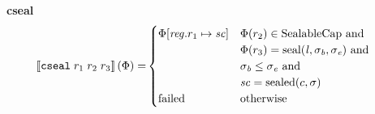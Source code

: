 \documentclass[a4paper]{article}
\newcommand{\sem}[1]{\left\llbracket #1 \right\rrbracket}
\newcommand{\tand}{\text{ and }}
\newcommand{\totherwise}{\text{otherwise }}
\newcommand{\targetcolor}[1]{\color{black}}
\newcommand{\trg}[1]{{\targetcolor{} #1}}
\newcommand{\zinstr}[1]{\texttt{#1}}
\newcommand{\threeinstr}[4]{
  \ifthenelse{\equal{#2#3#4}{}}
  {\zinstr{#1}}
  {\zinstr{#1} \; #2 \; #3 \; #4}
}
\newcommand{\tcseal}[3]{\threeinstr{\trg{cseal}}{#1}{#2}{#3}}
\newcommand{\update}[2]{[#1 \mapsto #2]}
\newcommand{\updReg}[2]{\update{\reg.#1}{#2}}
\newcommand{\shareddom}[1]{\mathrm{#1}}
\newcommand{\SealableCaps}{\shareddom{SealableCap}}
\newcommand{\lin}{\var{l}}
\newcommand{\seal}[1]{\shareddom{seal}(#1)}
\newcommand{\sealed}[1]{\shareddom{sealed}(#1)}
\newcommand{\failed}{\mathrm{failed}}
\newcommand{\var}[1]{\mathit{#1}}
\newcommand{\reg}{\var{reg}}
\newcommand{\vsc}{\var{sc}}
\newcommand{\baddr}{\var{b}}
\newcommand{\eaddr}{\var{e}}
\begin{document}
\noindent\textbf{cseal}\\
\begin{align*}
  \sem{\tcseal{r_1}{r_2}{r_3}}(\Phi) = &
                                  \begin{cases}
                                    \Phi\updReg{r_1}{\vsc} &
                                    \arraycolsep=0pt
                                    \begin{array}[t]{l}
                                      \Phi(r_2) \in \SealableCaps \tand \\
                                      \Phi(r_3) = \seal{\lin, \sigma_\baddr, \sigma_\eaddr} \tand \\
                                      \sigma_\baddr \leq \sigma_\eaddr \tand \\ 
                                      \vsc = \sealed{c,\sigma}
                                    \end{array}
                                    \\
                                    \failed & \totherwise
                                  \end{cases}
\end{align*}
\end{document}
